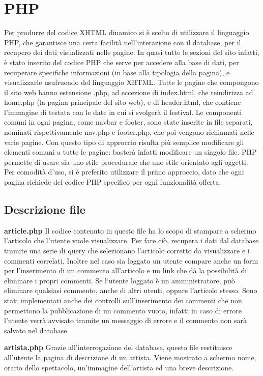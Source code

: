 \documentclass[10pt, a4paper]{article}
\begin{document}
\section{PHP}
Per produrre del codice XHTML dinamico si è scelto di utilizzare il linguaggio PHP, che garantisce una certa facilità nell’interazione con il database, per il recupero dei dati visualizzati nelle pagine.
In quasi tutte le sezioni del sito infatti, è stato inserito del codice PHP che serve per accedere alla base di dati, per recuperare specifiche informazioni (in base alla tipologia della pagina), e visualizzarle usufruendo del linguaggio XHTML.
Tutte le pagine che compongono il sito web hanno estensione .php, ad eccezione di index.html, che reindirizza ad home.php (la pagina principale del sito web), e di header.html, che contiene l’immagine di testata con le date in cui si svolgerà il festival.
Le componenti comuni in ogni pagina, come navbar e footer, sono state inserite in file separati, nominati rispettivamente nav.php e footer.php, che poi vengono richiamati nelle varie pagine.
Con questo tipo di approccio risulta più semplice modificare gli elementi comuni a tutte le pagine: basterà infatti modificare un singolo file.
PHP permette di usare sia uno stile procedurale che uno stile orientato agli oggetti. Per comodità d’uso, si è preferito utilizzare il primo approccio, dato che ogni pagina richiede del codice PHP specifico per ogni funzionalità offerta.


\subsection{Descrizione file}
\textbf{article.php}
Il codice contenuto in questo file ha lo scopo di stampare a schermo l’articolo che l’utente vuole visualizzare. Per fare ciò, recupera i dati dal database tramite una serie di query che selezionano l’articolo corretto da visualizzare e i commenti correlati.
Inoltre nel caso sia loggato un utente compare anche un form per l’inserimento di un commento all’articolo e un link che dà la possibilità di eliminare i propri commenti.
Se l‘utente loggato è un amministratore, può eliminare qualsiasi commento, anche di altri utenti, oppure l’articolo stesso. 
Sono stati implementati anche dei controlli sull’inserimento dei commenti che non permettono la pubblicazione di un commento vuoto, infatti in caso di errore l’utente verrà avvisato tramite un messaggio di errore e il commento non sarà salvato nel database.


\textbf{artista.php}
Grazie all’interrogazione del database, questo file restituisce all’utente la pagina di descrizione di un artista.
Viene mostrato a schermo nome, orario dello spettacolo, un’immagine dell’artista ed una breve descrizione. 
\end{document}
